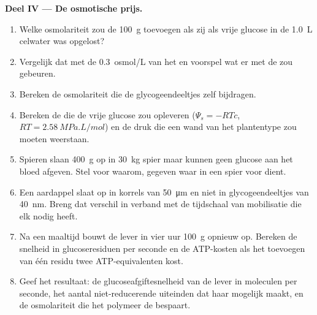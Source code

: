 \begin{problem}
\medskip
\noindent\textbf{Deel IV --- De osmotische prijs.}
\begin{enumerate}[resume]
  \item Welke osmolariteit zou de \qty{100}{g} toevoegen als zij als vrije
        glucose in de \qty{1.0}{L} celwater was opgelost?
  \item Vergelijk dat met de \qty{0.3}{osmol/L} van het  en voorspel
        wat er met de  zou gebeuren.
  \item Bereken de osmolariteit die de glycogeendeeltjes zelf bijdragen.
  \item Bereken de  die de vrije glucose zou opleveren
        ($\Psi_s = -RTc$, $RT = \qty{2.58}{MPa.L/mol}$) en de druk die een
        wand van het plantentype zou moeten weerstaan.
  \item Spieren slaan \qty{400}{g}  op in \qty{30}{kg} spier maar
        kunnen geen glucose aan het bloed afgeven. Stel voor waarom, gegeven
        waar  in een spier voor dient.
  \item Een aardappel slaat  op in korrels van \qty{50}{\micro m} en
        niet in glycogeendeeltjes van \qty{40}{nm}. Breng dat verschil in
        verband met de tijdschaal van mobilisatie die elk  nodig
        heeft.
  \item Na een maaltijd bouwt de lever in vier uur \qty{100}{g} 
        opnieuw op. Bereken de snelheid in glucoseresiduen per seconde en
        de ATP-kosten als het toevoegen van één residu twee
        ATP-equivalenten kost.
  \item Geef het resultaat: de glucoseafgiftesnelheid van de lever in
        moleculen per seconde, het aantal niet-reducerende uiteinden dat
        haar mogelijk maakt, en de osmolariteit die het polymeer de 
        bespaart.
\end{enumerate}
\end{problem}
